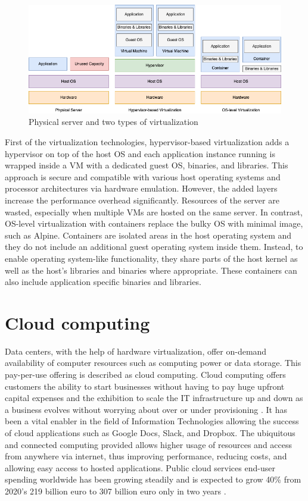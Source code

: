 \begin{figure}[ht]
  \begin{center}
    \includegraphics[width=13.5cm]{images/VirtualizationTypes.png}
    \caption{Physical server and two types of virtualization}
    \label{fig:VirtualizationTypes}
  \end{center}
\end{figure}

First of the virtualization technologies, hypervisor-based virtualization adds a hypervisor on top of the host OS and each application instance running is wrapped inside a VM with a dedicated guest OS, binaries, and libraries. This approach is secure and compatible with various host operating systems and processor architectures via hardware emulation. However, the added layers increase the performance overhead significantly. Resources of the server are wasted, especially when multiple VMs are hosted on the same server. In contrast, OS-level virtualization with containers replace the bulky OS with minimal image, such as Alpine. Containers are isolated areas in the host operating system and they do not include an additional guest operating system inside them. Instead, to enable operating system-like functionality, they share parts of the host kernel as well as the host’s libraries and binaries where appropriate. These containers can also include application specific binaries and libraries. \cite{Toimela2017}

\section{Cloud computing}

Data centers, with the help of hardware virtualization, offer on-demand availability of computer resources such as computing power or data storage. This pay-per-use offering is described as cloud computing. Cloud computing offers customers the ability to start businesses without having to pay huge upfront capital expenses and the exhibition to scale the IT infrastructure up and down as a business evolves without worrying about over or under provisioning \cite{Xing2012}. It has been a vital enabler in the field of Information Technologies allowing the success of cloud applications such as Google Docs, Slack, and Dropbox. The ubiquitous and connected computing provided allows higher usage of resources and access from anywhere via internet, thus improving performance, reducing costs, and allowing easy access to hosted applications. Public cloud services end-user spending worldwide has been growing steadily and is expected to grow 40\% from 2020's 219 billion euro to 307 billion euro only in two years \cite{PublicCloudStatista}.

